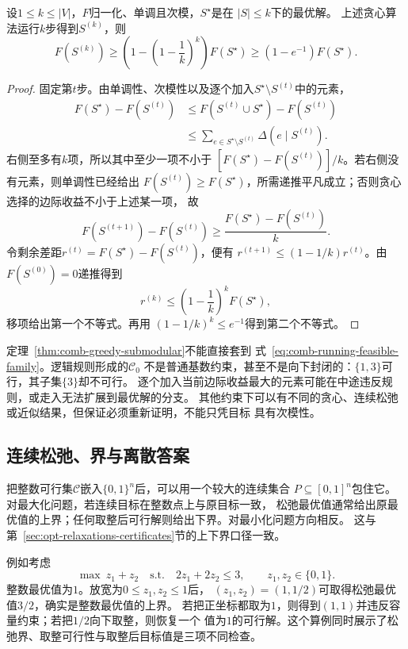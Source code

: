\begin{theorem}[单调次模最大化的贪心界]
\label{thm:comb-greedy-submodular}
设$1\leq k\leq|V|$，$F$归一化、单调且次模，$S^\star$是在
$|S|\leq k$下的最优解。
上述贪心算法运行$k$步得到$S^{(k)}$，则
\begin{equation}
  F(S^{(k)})
  \geq
  \left(1-\left(1-\frac1k\right)^k\right)F(S^\star)
  \geq(1-e^{-1})F(S^\star).
  \label{eq:comb-greedy-bound}
\end{equation}
\end{theorem}

\begin{proof}
固定第$t$步。由单调性、次模性以及逐个加入$S^\star\setminus S^{(t)}$中的元素，
\begin{align*}
  F(S^\star)-F(S^{(t)})
  &\leq F(S^{(t)}\cup S^\star)-F(S^{(t)})\\
  &\leq\sum_{e\in S^\star\setminus S^{(t)}}\Delta(e\mid S^{(t)}).
\end{align*}
右侧至多有$k$项，所以其中至少一项不小于
$[F(S^\star)-F(S^{(t)})]/k$。若右侧没有元素，则单调性已经给出
$F(S^{(t)})\geq F(S^\star)$，所需递推平凡成立；否则贪心选择的边际收益不小于上述某一项，
故
\[
  F(S^{(t+1)})-F(S^{(t)})
  \geq\frac{F(S^\star)-F(S^{(t)})}{k}.
\]
令剩余差距$r^{(t)}=F(S^\star)-F(S^{(t)})$，便有
$r^{(t+1)}\leq(1-1/k)r^{(t)}$。由$F(S^{(0)})=0$递推得到
\[
  r^{(k)}\leq\left(1-\frac1k\right)^kF(S^\star),
\]
移项给出第一个不等式。再用
$(1-1/k)^k\leq e^{-1}$得到第二个不等式。
\end{proof}

定理~\ref{thm:comb-greedy-submodular}不能直接套到
式~\eqref{eq:comb-running-feasible-family}。逻辑规则形成的$\mathcal{C}_0$
不是普通基数约束，甚至不是向下封闭的：$\{1,3\}$可行，其子集$\{3\}$却不可行。
逐个加入当前边际收益最大的元素可能在中途违反规则，或走入无法扩展到最优解的分支。
其他约束下可以有不同的贪心、连续松弛或近似结果，但保证必须重新证明，不能只凭目标
具有次模性。

\subsection{连续松弛、界与离散答案}

把整数可行集$\mathcal{C}$嵌入$\{0,1\}^n$后，可以用一个较大的连续集合
$P\subseteq[0,1]^n$包住它。对最大化问题，若连续目标在整数点上与原目标一致，
松弛最优值通常给出原最优值的上界；任何取整后可行解则给出下界。对最小化问题方向相反。
这与第~\ref{sec:opt-relaxations-certificates}节的上下界口径一致。

例如考虑
\[
  \max\ z_1+z_2
  \quad\text{s.t.}\quad
  2z_1+2z_2\leq3,\qquad z_1,z_2\in\{0,1\}.
\]
整数最优值为$1$。放宽为$0\leq z_1,z_2\leq1$后，
$(z_1,z_2)=(1,1/2)$可取得松弛最优值$3/2$，确实是整数最优值的上界。
若把正坐标都取为$1$，则得到$(1,1)$并违反容量约束；若把$1/2$向下取整，则恢复一个
值为$1$的可行解。这个算例同时展示了松弛界、取整可行性与取整后目标值是三项不同检查。


